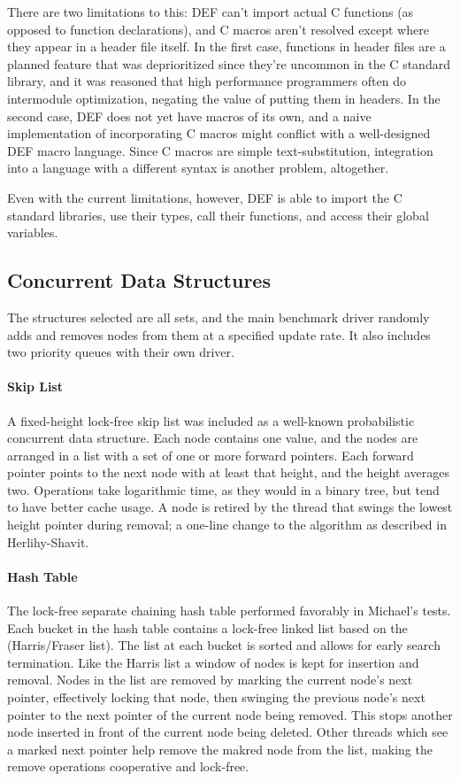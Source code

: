 There are two limitations to this: DEF can't import actual C functions (as opposed to function declarations), and C macros aren't resolved except where they appear in a header file itself.  In the first case, functions in header files are a planned feature that was deprioritized since they're uncommon in the C standard library, and it was reasoned that high performance programmers often do intermodule optimization, negating the value of putting them in headers.  In the second case, DEF does not yet have macros of its own, and a naive implementation of incorporating C macros might conflict with a well-designed DEF macro language.  Since C macros are simple text-substitution, integration into a language with a different syntax is another problem, altogether.

Even with the current limitations, however, DEF is able to import the C standard libraries, use their types, call their functions, and access their global variables.

\subsection{Concurrent Data Structures}

The structures selected are all sets, and the main benchmark driver randomly adds and removes nodes from them at a specified update rate.  It also includes two priority queues with their own driver.

\paragraph{Skip List} A fixed-height lock-free skip list was included as a well-known probabilistic concurrent data structure.  Each node contains one value, and the nodes are arranged in a list with a set of one or more forward pointers.  Each forward pointer points to the next node with at least that height, and the height averages two.  Operations take logarithmic time, as they would in a binary tree, but tend to have better cache usage.  A node is retired by the thread that swings the lowest height pointer during removal; a one-line change to the algorithm as described in Herlihy-Shavit.\cite{HSBook}

\paragraph{Hash Table} The lock-free separate chaining hash table performed favorably in Michael's tests.\cite{HashTables} Each bucket in the hash table contains a lock-free linked list based on the (Harris/Fraser list). The list at each bucket is sorted and allows for early search termination. Like the Harris list a window of nodes is kept for insertion and removal. Nodes in the list are removed by marking the current node's next pointer, effectively locking that node, then swinging the previous node's next pointer to the next pointer of the current node being removed. This stops another node inserted in front of the current node being deleted. Other threads which see a marked next pointer help remove the makred node from the list, making the remove operations cooperative and lock-free.

